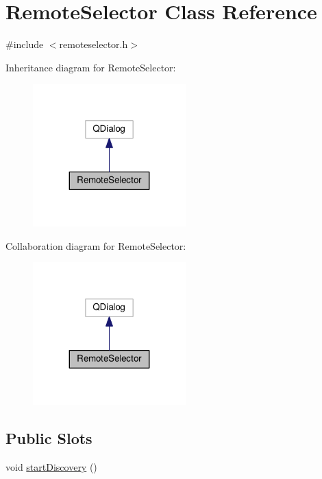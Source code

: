 \hypertarget{classRemoteSelector}{}\section{Remote\+Selector Class Reference}
\label{classRemoteSelector}


{\ttfamily \#include $<$remoteselector.\+h$>$}



Inheritance diagram for Remote\+Selector\+:\nopagebreak
\begin{figure}[H]
\begin{center}
\leavevmode
\includegraphics[width=167pt]{classRemoteSelector__inherit__graph}
\end{center}
\end{figure}


Collaboration diagram for Remote\+Selector\+:\nopagebreak
\begin{figure}[H]
\begin{center}
\leavevmode
\includegraphics[width=167pt]{classRemoteSelector__coll__graph}
\end{center}
\end{figure}
\subsection*{Public Slots}
\begin{DoxyCompactItemize}
\item 
void \hyperlink{classRemoteSelector_a63cf76514fa5b2bf1b85b87db1a49e99}{start\+Discovery} ()
\end{DoxyCompactItemize}
